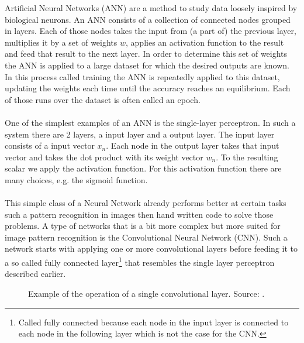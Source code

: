 \documentclass[10 pt, a4paper]{article}
\begin{document}
Artificial Neural Networks (ANN) are a method to study data loosely inspired by biological neurons. An ANN consists of a collection of connected nodes grouped in layers. Each of those nodes takes the input from (a part of) the previous layer, multiplies it by a set of weights $w$, applies an activation function to the result and feed that result to the next layer. In order to determine this set of weights the ANN is applied to a large dataset for which the desired outputs are known. In this process called training the ANN is repeatedly applied to this dataset, updating the weights each time until the accuracy reaches an equilibrium. Each of those runs over the dataset is often called an epoch.
\\
\\
One of the simplest examples of an ANN is the single-layer perceptron. In such a system there are 2 layers, a input layer and a output layer. The input layer consists of a input vector $x_n$. Each node in the output layer takes that input vector and takes the dot product with its weight vector $w_n$. To the resulting scalar we apply the activation function. For this activation function there are many choices, e.g. the sigmoid function. 
\\
\\
This simple class of a Neural Network already performs better at certain tasks such a pattern recognition in images then hand written code to solve those problems. A type of networks that is a bit more complex but more suited for image pattern recognition is the Convolutional Neural Network (CNN). Such a network starts with applying one or more convolutional layers before feeding it to a so called fully connected layer\footnote{Called fully connected because each node in the input layer is connected to each node in the following layer which is not the case for the CNN.} that resembles the single layer perceptron  described earlier.

\begin{figure}[H]
\centering
\caption{Example of the operation of a single convolutional layer. Source: \cite{deep}. \label{fig:CNNop}}
\end{figure}
\end{document}
